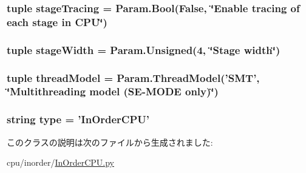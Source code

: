 \label{classInOrderCPU_1_1InOrderCPU_a9bc688118111286e54b0856ba347ec12}
\hypertarget{classInOrderCPU_1_1InOrderCPU_a1f582486a8f1132a6b4d887e1eaa8720}{
\subsubsection[{stageTracing}]{\setlength{\rightskip}{0pt plus 5cm}tuple {\bf stageTracing} = Param.Bool(False, \char`\"{}Enable tracing of each stage in CPU\char`\"{})}}
\label{classInOrderCPU_1_1InOrderCPU_a1f582486a8f1132a6b4d887e1eaa8720}
\hypertarget{classInOrderCPU_1_1InOrderCPU_aa8845475b9a7edffd6e4af8229af406a}{
\subsubsection[{stageWidth}]{\setlength{\rightskip}{0pt plus 5cm}tuple {\bf stageWidth} = Param.Unsigned(4, \char`\"{}Stage width\char`\"{})}}
\label{classInOrderCPU_1_1InOrderCPU_aa8845475b9a7edffd6e4af8229af406a}
\hypertarget{classInOrderCPU_1_1InOrderCPU_ad09c85591c223511ab9f14c56fb8c294}{
\subsubsection[{threadModel}]{\setlength{\rightskip}{0pt plus 5cm}tuple {\bf threadModel} = Param.ThreadModel('SMT', \char`\"{}Multithreading model (SE-\/MODE only)\char`\"{})}}
\label{classInOrderCPU_1_1InOrderCPU_ad09c85591c223511ab9f14c56fb8c294}
\hypertarget{classInOrderCPU_1_1InOrderCPU_acce15679d830831b0bbe8ebc2a60b2ca}{
\subsubsection[{type}]{\setlength{\rightskip}{0pt plus 5cm}string {\bf type} = '{\bf InOrderCPU}'}}
\label{classInOrderCPU_1_1InOrderCPU_acce15679d830831b0bbe8ebc2a60b2ca}


このクラスの説明は次のファイルから生成されました:\begin{DoxyCompactItemize}
\item 
cpu/inorder/\hyperlink{InOrderCPU_8py}{InOrderCPU.py}\end{DoxyCompactItemize}
